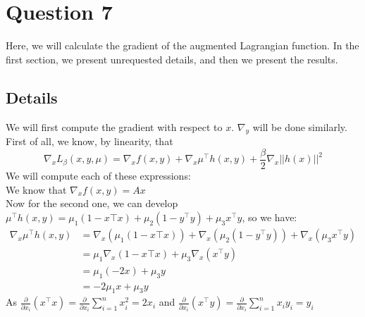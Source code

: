 \documentclass{article}
\newcommand{\R}{\mathbb{R}}
\newcommand{\tp}{^\top}
\newcommand{\p}{\frac{\partial}{\partial x_i}}
\begin{document}
\begin{comment}
So we may take $(x^*,  y^*) = (v_{\min }(A), v_{\min} (B))$, where $v_{\min }(A)$ and $v_{\min }(B)$ are the unit-normed eigenvectors of $\lambda_{\min}(A)$ and $\lambda_{\max}(B)$ respectively. \\
At this point, we need to recall that $(x^*,y^*)$ must belong to the set $S$, or equivalently we must have $h(x^*,y^*)=0$. By taking unit-normed eigenvectors, we ensure that $h_1(x^*,y^*)=0=h_2(x^*,y^*)$. The last condition is $h_3(x^*,y^*) = 0$. By definition of $h_3$, this means $(x^*)\tp y^* = 0$, i.e. $x^*$ and $y^*$ need to be orthogonal in $\R^n$. This is the only assumption we do not know, but observe that as soon as we know it the previous reasoning implies that the assumptions of the strong duality theorem are satisfied.\\

Hence, we can always find $\mu^*\in\R^3$ such that $(\text{A}2)$ is satisfied, but we cannot always ensure that $(\text{A}1)$ is satisfied. One condition that can ensure it however, is that the eigenvectors of $A$ and $B$ corresponding to their smallest eigenvalues are orthogonal. We can not expect to have this before solving the problem if we don't have specific informations about $A$ and $B$ other that them being symmetric.
\end{comment}



\section*{Question 7}
Here, we will calculate the gradient of the augmented Lagrangian function. In the first section, we present unrequested details, and then we present the results.
\subsection*{Details}

We will first compute the gradient with respect to $x$. $\nabla_y$ will be done similarly.\\
First of all, we know, by linearity, that 
$$\nabla_x L_{\beta}(x,y,\mu)=\nabla_x f(x,y) + \nabla_x \mu\tp h(x,y)+ \frac{\beta}{2} \nabla_x ||h(x)||^2$$
We will compute each of these expressions:\\

We know that $\nabla_x f(x,y)= Ax$\\

Now for the second one, we can develop $\mu\tp h(x,y)=\mu_1 (1-x\top x)+\mu_2(1-y\tp y) + \mu_3 x\tp y$, so we have:
\begin{align*}
\nabla_x \mu\tp h(x,y)&=\nabla_x (\mu_1 (1-x\top x))+\nabla_x (\mu_2(1-y\tp y)) +\nabla_x ( \mu_3 x\tp y)\\
&=\mu_1 \nabla_x (1-x\top x) + \mu_3 \nabla_x ( x\tp y)\\
&= \mu_1 (-2x) + \mu_3 y\\
&= - 2\mu_1 x+\mu_3 y
\end{align*}
As $\p(x\tp x)=\p \sum_{i=1}^n x_i^2=2x_i$ and  $\p(x\tp y)=\p \sum_{i=1}^n x_i y_i=y_i$\\
\end{document}
